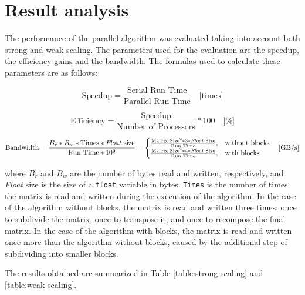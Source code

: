 \section*{Result analysis}

The performance of the parallel algorithm was evaluated taking into account both strong and weak scaling. %
The parameters used for the evaluation are the speedup, the efficiency gains and the bandwidth. The formulas %
used to calculate these parameters are as follows:

\begin{equation}
    \label{eq:speedup}
    \text{Speedup} = \frac{\text{Serial Run Time}}{\text{Parallel Run Time}} \quad \text{[times]}
\end{equation}

\begin{equation}
    \label{eq:efficiency}
    \text{Efficiency} = \frac{\text{Speedup}}{\text{Number of Processors}} * 100 \quad \text{[\%]}
\end{equation}

\begin{equation}
    \label{eq:bandwidth}
    \text{Bandwidth} = \frac{B_r * B_w * \text{Times} * \text{\textit{Float} size}}{\text{Run Time} * 10^9} = 
    \begin{cases}
        \frac{\text{Matrix Size}^2 * 3 * \text{\textit{Float} Size}}{\text{Run Time}}, & \text{without blocks}\\
        \frac{\text{Matrix Size}^2 * 4 * \text{\textit{Float} Size}}{\text{Run Time}}, & \text{with blocks}
    \end{cases} \quad
    \text{[GB/s]}
\end{equation}

where $B_r$ and $B_w$ are the number of bytes read and written, respectively, and \textit{Float} size is the size of a %
\texttt{float} variable in bytes. \texttt{Times} is the number of times the matrix is read and written during the execution %
of the algorithm. In the case of the algorithm without blocks, the matrix is read and written three times: once to subdivide %
the matrix, once to transpose it, and once to recompose the final matrix. In the case of the algorithm with blocks, the matrix %
is read and written once more than the algorithm without blocks, caused by the additional step of subdividing into smaller blocks.

The results obtained are summarized in Table \ref{table:strong-scaling} and \ref{table:weak-scaling}. %





